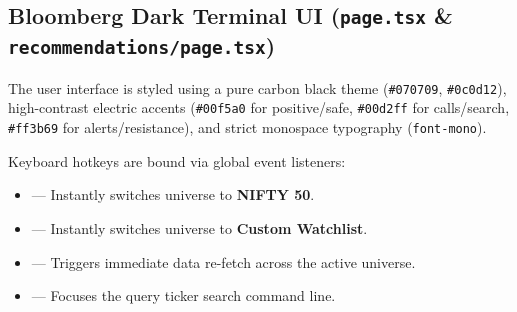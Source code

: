 \subsection{Bloomberg Dark Terminal UI (\texttt{page.tsx} \& \texttt{recommendations/page.tsx})}
The user interface is styled using a pure carbon black theme (\texttt{\#070709}, \texttt{\#0c0d12}), high-contrast electric accents (\texttt{\#00f5a0} for positive/safe, \texttt{\#00d2ff} for calls/search, \texttt{\#ff3b69} for alerts/resistance), and strict monospace typography (\texttt{font-mono}).

\noindent Keyboard hotkeys are bound via global event listeners:
\begin{itemize}
    \item {} --- Instantly switches universe to \textbf{NIFTY 50}.
    \item {} --- Instantly switches universe to \textbf{Custom Watchlist}.
    \item {} --- Triggers immediate data re-fetch across the active universe.
    \item \kbd{/} --- Focuses the query ticker search command line.
\end{itemize}
